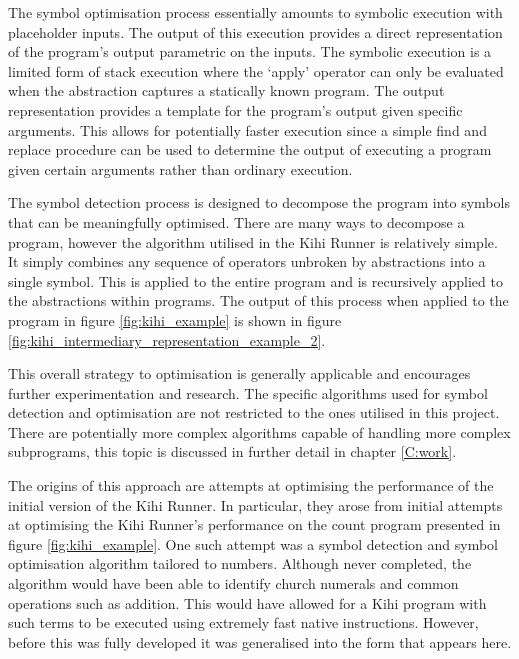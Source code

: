 The symbol optimisation process essentially amounts to symbolic execution with placeholder inputs. The output of this execution provides a direct representation of the program's output parametric on the inputs. The symbolic execution is a limited form of stack execution where the `apply' operator can only be evaluated when the abstraction captures a statically known program. The output representation provides a template for the program's output given specific arguments. This allows for potentially faster execution since a simple find and replace procedure can be used to determine the output of executing a program given certain arguments rather than ordinary execution. 



The symbol detection process is designed to decompose the program into symbols that can be meaningfully optimised. There are many ways to decompose a program, however the algorithm utilised in the Kihi Runner is relatively simple. It simply combines any sequence of operators unbroken by abstractions into a single symbol. This is applied to the entire program and is recursively applied to the abstractions within programs. The output of this process when applied to the program in figure \ref{fig:kihi_example} is shown in figure \ref{fig:kihi_intermediary_representation_example_2}.

This overall strategy to optimisation is generally applicable and encourages further experimentation and research. The specific algorithms used for symbol detection and optimisation are not restricted to the ones utilised in this project. There are potentially more complex algorithms capable of handling more complex subprograms, this topic is discussed in further detail in chapter \ref{C:work}.

The origins of this approach are attempts at optimising the performance of the initial version of the Kihi Runner. In particular, they arose from initial attempts at optimising the Kihi Runner's performance on the count program presented in figure \ref{fig:kihi_example}. One such attempt was a symbol detection and symbol optimisation algorithm tailored to numbers. Although never completed, the algorithm would have been able to identify church numerals and common operations such as addition. This would have allowed for a Kihi program with such terms to be executed using extremely fast native instructions. However, before this was fully developed it was generalised into the form that appears here.


